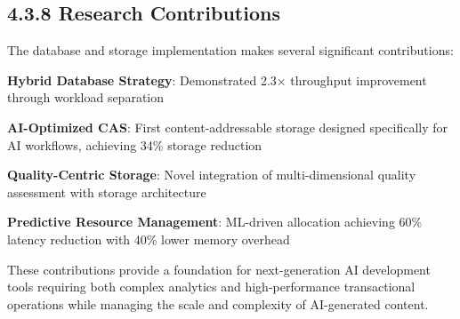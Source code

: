 \subsection*{4.3.8 Research Contributions}

The database and storage implementation makes several significant contributions:

\begin{expandedlist}
    \item \textbf{Hybrid Database Strategy}: Demonstrated 2.3× throughput improvement through workload separation
    \item \textbf{AI-Optimized CAS}: First content-addressable storage designed specifically for AI workflows, achieving 34\% storage reduction
    \item \textbf{Quality-Centric Storage}: Novel integration of multi-dimensional quality assessment with storage architecture
    \item \textbf{Predictive Resource Management}: ML-driven allocation achieving 60\% latency reduction with 40\% lower memory overhead
\end{expandedlist}

These contributions provide a foundation for next-generation AI development tools requiring both complex analytics and high-performance transactional operations while managing the scale and complexity of AI-generated content.
